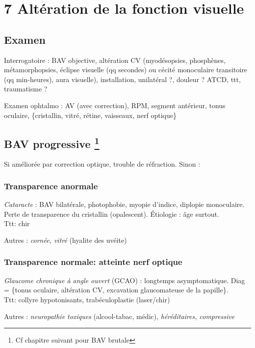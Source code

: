 \documentclass[11pt]{article}
\def\ttt{\hspace*{1cm}Ttt: }
\begin{document}
\section{7 Altération de la fonction visuelle}
\label{sec:org5a272cc}
\subsection{Examen}
\label{sec:org900e237}
Interrogatoire : BAV objective, altération CV  (myodésopsies, phosphènes,
métamorphopsies, éclipse visuelle (qq secondes) ou cécité monoculaire
transitoire (qq min-heures), aura visuelle), installation, unilatéral ?, douleur
? ATCD, ttt, traumatisme ?

Examen ophtalmo : AV (avec correction), RPM, segment antérieur, tonus oculaire,
\{cristallin, vitré, rétine, vaisseaux, nerf optique\}

\subsection{BAV progressive \footnote{Cf chapitre suivant pour BAV brutale}}
\label{sec:org149ff65}
Si améliorée par correction optique, trouble de réfraction. Sinon :

\subsubsection{Transparence anormale}
\label{sec:org01e2880}
\emph{Cataracte} : BAV bilatérale, photophobie, myopie d'indice, diplopie
monoculaire. Perte de transparence du cristallin (opalescent). Étiologie : âge
surtout.\\
\ttt chir

Autres : \emph{cornée, vitré} (hyalite des uvéite)

\subsubsection{Transparence normale: atteinte nerf optique}
\label{sec:org8003054}
\emph{Glaucome chronique à angle ouvert} (GCAO) : longtemps asymptomatique. Diag =
\{\inc tonus oculaire, altération CV, excavation glaucomateuse de la
papille\}. \\
\ttt collyre hypotonisants, trabéculoplastie (laser/chir)

Autres : \emph{neuropathie toxiques} (alcool-tabac, médic), \emph{héréditaires, compressive}
\end{document}
